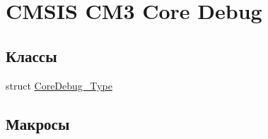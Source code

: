 \hypertarget{group___c_m_s_i_s___c_m3___core_debug}{}\section{C\+M\+S\+IS C\+M3 Core Debug}
\label{group___c_m_s_i_s___c_m3___core_debug}
\subsection*{Классы}
\begin{DoxyCompactItemize}
\item 
struct \mbox{\hyperlink{struct_core_debug___type}{Core\+Debug\+\_\+\+Type}}
\end{DoxyCompactItemize}
\subsection*{Макросы}
